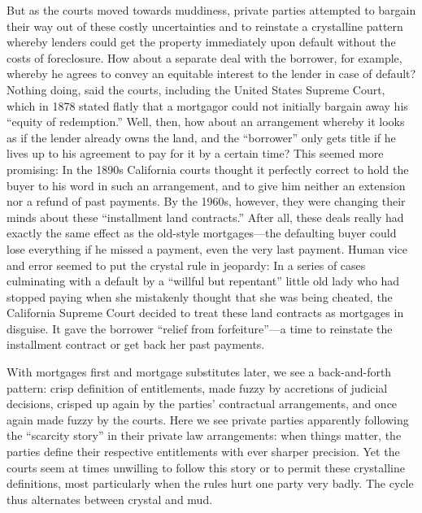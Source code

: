 But as the courts moved towards muddiness, private parties attempted to bargain
their way out of these costly uncertainties and to reinstate a crystalline
pattern whereby lenders could get the property immediately upon default without
the costs of foreclosure. How about a separate deal with the borrower, for
example, whereby he agrees to convey an equitable interest to the lender in
case of default? Nothing doing, said the courts, including the United States
Supreme Court, which in 1878 stated flatly that a mortgagor could not initially
bargain  away his ``equity of redemption.'' Well, then, how about an arrangement
whereby it looks as if the lender already owns the land, and the ``borrower''
only gets title if he lives up to his agreement to pay for it by a certain
time? This seemed more promising: In the 1890s California courts thought it
perfectly correct to hold the buyer to his word in such an arrangement, and to
give him neither an extension nor a refund of past payments. By the 1960s,
however, they were changing their minds about these ``installment land
contracts.''  After all, these deals really had exactly the same effect as the
old-style mortgages---the defaulting buyer could lose everything if he missed
a payment, even the very last payment. Human vice and error seemed to put the
crystal rule in jeopardy: In a series of cases culminating with a default by a
``willful but repentant'' little old lady who had stopped paying when she
mistakenly thought that she was being cheated, the California Supreme Court
decided to treat these land contracts as mortgages in disguise.  It gave the
borrower ``relief from forfeiture''---a time to reinstate the installment
contract or get back her past payments.  

With mortgages first and mortgage substitutes later, we see a back-and-forth
pattern: crisp definition of entitlements, made fuzzy by accretions of judicial
decisions, crisped up again by the parties' contractual arrangements, and once
again made fuzzy by the courts. Here we see private parties apparently
following the ``scarcity story'' in their private law arrangements: when things
matter, the parties define their respective entitlements with ever sharper
precision. Yet the courts seem at times unwilling to follow this story or to
permit these crystalline definitions, most particularly when the rules hurt one
party very badly. The cycle thus alternates between crystal and mud.

